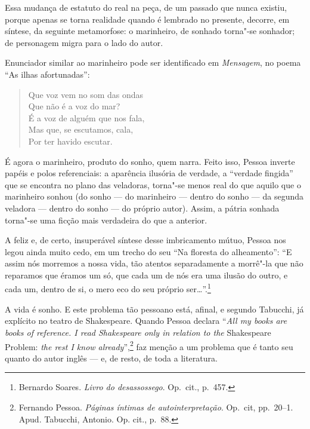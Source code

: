 Essa mudança de estatuto do real na peça, de um passado que nunca
existiu, porque apenas se torna realidade quando é lembrado no
presente, decorre, em síntese, da seguinte metamorfose: o marinheiro,
de sonhado torna"-se sonhador; de personagem migra para o lado do autor.


Enunciador similar ao marinheiro pode ser
identificado em
\textit{Mensagem}, no poema “As
ilhas afortunadas”: 
\begin{hedraquote}
\begin{verse}
Que voz vem no som das ondas\\
Que não é a voz do mar?\\ 
É a voz de alguém que nos fala,\\
Mas que, se escutamos, cala,\\
Por ter havido escutar.
\end{verse}
\end{hedraquote}

É agora o marinheiro, produto do sonho, quem narra. Feito isso, Pessoa
inverte papéis e polos referenciais: a aparência ilusória de verdade, a
“verdade fingida” que se encontra no plano das veladoras, torna"-se
menos real do que aquilo que o marinheiro sonhou (do sonho --- do
marinheiro --- dentro do sonho --- da segunda veladora --- dentro do sonho ---
do próprio autor). Assim, a pátria sonhada torna"-se uma ficção mais
verdadeira do que a anterior. 

A feliz e, de certo, insuperável síntese desse imbricamento mútuo,
Pessoa nos legou ainda muito cedo, em um trecho do seu “Na floresta do 
alheamento”: “E assim nós morremos a
nossa vida, tão atentos separadamente a morrê"-la que não reparamos que
éramos um só, que cada um de nós era uma ilusão do outro, e cada um,
dentro de si, o mero eco do seu próprio ser\ldots{}”.\footnote{ 
Bernardo Soares. \textit{Livro do desassossego}. Op.~cit., p.~457.}

A vida é sonho. E este problema tão pessoano está, afinal, e segundo
Tabucchi, já explícito no teatro de Shakespeare. Quando Pessoa declara
``\textit{All my books are books of reference. I read Shakespeare only in
relation to the} Shakespeare Problem: \textit{the rest I know
already}'',\footnote{ Fernando Pessoa. \textit{Páginas íntimas de
autointerpretação}. Op.~cit, pp.~20--1. Apud. Tabucchi, Antonio. Op.
cit., p.~88.} faz menção a um problema que é tanto seu quanto do autor
inglês --- e, de resto, de toda a literatura. 

